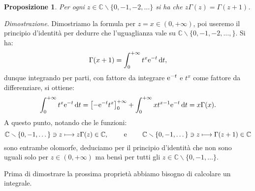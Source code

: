 \documentclass[11pt]{book}
\makeatletter
\theoremstyle{Definizione}
\theoremstyle{TeoremaProposizioneLemmaCorollarioCongettura}
\newtheorem{mypropo}[myteo]{Proposizione}
\theoremstyle{OsservazioneNotaEsempio}
\renewenvironment{proof}[1][\proofname]{\par
  \normalfont \topsep6\p@\@plus6\p@\relax
  \trivlist
  \item[\hskip\labelsep
        \itshape
    #1\@addpunct{.}]\ignorespaces
}{%
  \endtrivlist\@endpefalse
}
\renewenvironment{proof}{\textsl{Dimostrazione}.}{}
\newcommand{\C}{\mathbb{C}}
\newcommand{\tolto}{\smallsetminus}
\newcommand{\e}{\textup{e}}
\renewcommand{\d}{\mathrm{d}}
\newcommand{\dt}{\,\d t}
\makeatother
\begin{document}
\begin{boxpro}
\begin{mypropo}
Per ogni $z\in \C \tolto \{0,-1,-2,\dots\}$ si ha che $z \Gamma(z) = \Gamma(z+1)$.
\end{mypropo}
\tcblower
\begin{proof}
Dimostriamo la formula per $z = x \in (0,+\infty)$, poi useremo il principio d'identità per dedurre che l'uguaglianza vale su $\C \tolto \{0,-1,-2,\dots,\}$. Si ha:
$$
\Gamma(x+1) = \int_{0}^{+\infty} t^{x} \e^{-t}\dt,
$$
dunque integrando per parti, con fattore da integrare $\e^{-t}$ e $t^x$ come fattore da differenziare, si ottiene:
$$
\int_0^{+\infty} t^x\e^{-t}\dt = \left[-\e^{-t}t^x\right]_0^{+\infty}+\int_0^{+\infty} xt^{x-1}\e^{-t}\dt = x \Gamma(x).
$$
A questo punto, notando che le funzioni:
$$
\C\tolto \{0,-1,\dots\}\ni z \longmapsto z\Gamma(z)\in \C,\qquad \textup{ e }\qquad \C\tolto \{0,-1,\dots\}\ni z \longmapsto \Gamma(z+1)\in \C
$$
sono entrambe olomorfe, deduciamo per il principio d'identità che non sono uguali solo per $z\in (0,+\infty)$ ma bensì per tutti gli $z\in \C\tolto \{0,-1,\dots\}$.
\end{proof}
\end{boxpro}
\noindent
Prima di dimostrare la prossima proprietà abbiamo bisogno di calcolare un integrale.
\end{document}
